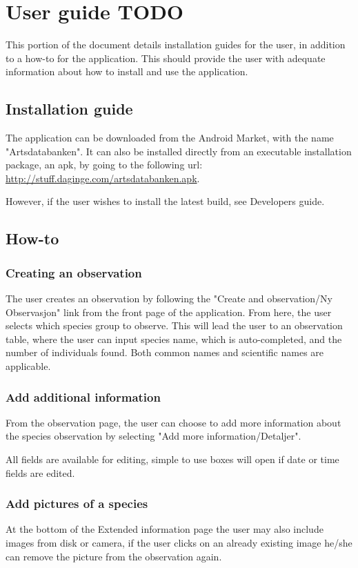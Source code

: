 \newpage
\section{User guide TODO}
This portion of the document details installation guides for the user, in addition to a how-to for the application. This should provide the user with adequate information about how to install and use the application.
\subsection{Installation guide}
The application can be downloaded from the Android Market, with the name "Artsdatabanken". It can also be installed directly from an executable installation package, an apk, by going to the following url: \url{http://stuff.daginge.com/artsdatabanken.apk}.

However, if the user wishes to install the latest build, see Developers guide.

\subsection{How-to}
\subsubsection{Creating an observation}
The user creates an observation by following the "Create and observation/Ny Observasjon" link from the front page of the application.
From here, the user selects which species group to observe. 
This will lead the user to an observation table, where the user can input species name, which is auto-completed, and the number of individuals found. 
Both common names and scientific names are applicable. 

\subsubsection{Add additional information}
From the observation page, the user can choose to add more information about the species observation by selecting "Add more information/Detaljer".

All fields are available for editing, simple to use boxes will open if date or time fields are edited.

\subsubsection{Add pictures of a species}
At the bottom of the Extended information page the user may also include images from disk or camera, if the user clicks on an already existing image he/she can remove the picture from the observation again.

